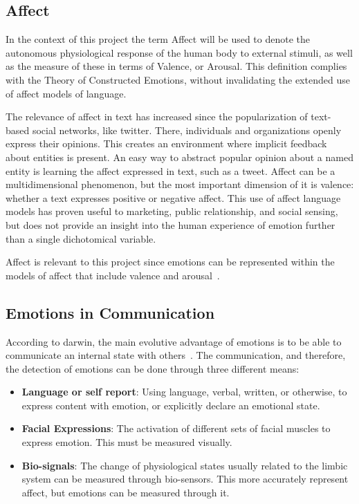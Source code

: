 
\subsection{Affect}\label{sub:Affect}
In the context of this project the term Affect will be used to denote the autonomous physiological response of the human body to external stimuli, as well as the measure of these in terms of Valence, or Arousal. This definition complies with the Theory of Constructed Emotions, without invalidating the extended use of affect models of language.

The relevance of affect in text has increased since the popularization of text-based social networks, like twitter. There, individuals and organizations openly express their opinions. This creates an environment where implicit feedback about entities is present. An easy way to abstract popular opinion about a named entity is learning the affect expressed in text, such as a tweet. Affect can be a multidimensional phenomenon, but the most important dimension of it is valence: whether a text expresses positive or negative affect. This use of affect language models has proven useful to marketing, public relationship, and social sensing, but does not provide an insight into the human experience of emotion further than a single dichotomical variable.

Affect is relevant to this project since emotions can be represented within the models of affect that include valence and arousal~\cite{barradas2016thesis}.

\subsection{Emotions in Communication}\label{sub:Emotions in Communication}
According to darwin, the main evolutive advantage of emotions is to be able to communicate an internal state with others~\cite{darwin1872emotions}. The communication, and therefore, the detection of emotions can be done through three different means:
\begin{itemize}
  \item \textbf{Language or self report}: Using language, verbal, written, or otherwise, to express content with emotion, or explicitly declare an emotional state.
  \item \textbf{Facial Expressions}: The activation of different sets of facial muscles to express emotion. This must be measured visually.
  \item \textbf{Bio-signals}: The change of physiological states usually related to the limbic system can be measured through bio-sensors. This more accurately represent affect, but emotions can be measured through it.
\end{itemize}

